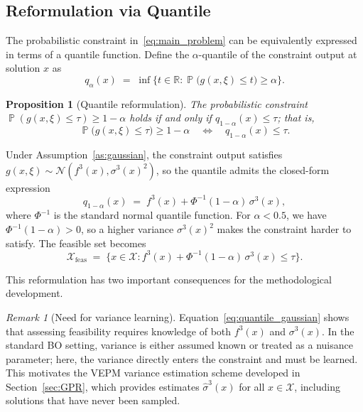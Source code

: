 \documentclass[12pt]{article}
\theoremstyle{plain}
\newtheorem{proposition}{Proposition}[section]
\theoremstyle{definition}
\theoremstyle{remark}
\newtheorem{remark}{Remark}[section]
\DeclareMathOperator{\Prob}{\mathbb{P}}
\newcommand{\R}{\mathbb{R}}
\newcommand{\cX}{\mathcal{X}}
\newcommand{\cN}{\mathcal{N}}
\begin{document}
\subsection{Reformulation via Quantile}\label{sec:quantile_reformulation}

The probabilistic constraint in~\eqref{eq:main_problem} can be
equivalently expressed in terms of a quantile function.  Define the
$\alpha$-quantile of the constraint output at solution $x$ as
\begin{equation}\label{eq:quantile_def}
  q_\alpha(x) \;=\; \inf\bigl\{t\in\R :
  \Prob\bigl(g(x,\xi)\le t\bigr)\ge\alpha\bigr\}.
\end{equation}

\begin{proposition}[Quantile reformulation]\label{prop:quantile}
The probabilistic constraint
$\Prob(g(x,\xi)\le\tau)\ge 1-\alpha$ holds if and only if
$q_{1-\alpha}(x)\le\tau$; that is,
\begin{equation}\label{eq:quantile_equiv}
  \Prob\bigl(g(x,\xi)\le\tau\bigr)\ge 1-\alpha
  \quad\Longleftrightarrow\quad
  q_{1-\alpha}(x)\le\tau.
\end{equation}
\end{proposition}

Under Assumption~\ref{as:gaussian}, the constraint output satisfies
$g(x,\xi)\sim\cN(f^3(x),\sigma^3(x)^2)$, so the quantile
admits the closed-form expression
\begin{equation}\label{eq:quantile_gaussian}
  q_{1-\alpha}(x) \;=\;
  f^3(x) + \Phi^{-1}(1-\alpha)\,\sigma^3(x),
\end{equation}
where $\Phi^{-1}$ is the standard normal quantile function.  For
$\alpha<0.5$, we have $\Phi^{-1}(1-\alpha)>0$, so a higher variance
$\sigma^3(x)^2$ makes the constraint harder to satisfy.  The
feasible set becomes
\begin{equation}\label{eq:feasible_gaussian}
  \cX_{\mathrm{feas}} \;=\; \bigl\{x\in\cX :
  f^3(x)+\Phi^{-1}(1-\alpha)\,\sigma^3(x)\le\tau\bigr\}.
\end{equation}

This reformulation has two important consequences for the
methodological development.

\begin{remark}[Need for variance learning]\label{rem:variance_learning}
Equation~\eqref{eq:quantile_gaussian} shows that assessing
feasibility requires knowledge of both $f^3(x)$ and
$\sigma^3(x)$.  In the standard BO setting, variance is either
assumed known or treated as a nuisance parameter; here, the variance
directly enters the constraint and must be learned.  This motivates
the VEPM variance estimation scheme developed in Section~\ref{sec:GPR},
which provides estimates $\hat{\sigma}^3(x)$ for all
$x\in\cX$, including solutions that have never been sampled.
\end{remark}
\end{document}
